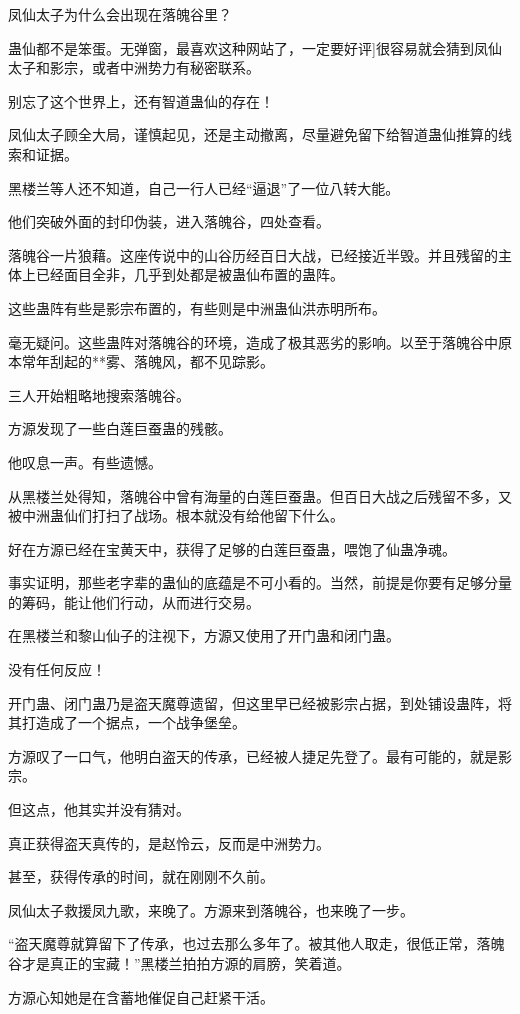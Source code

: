 \begin{this_body}
凤仙太子为什么会出现在落魄谷里？

蛊仙都不是笨蛋。无弹窗，最喜欢这种网站了，一定要好评]很容易就会猜到凤仙太子和影宗，或者中洲势力有秘密联系。

别忘了这个世界上，还有智道蛊仙的存在！

凤仙太子顾全大局，谨慎起见，还是主动撤离，尽量避免留下给智道蛊仙推算的线索和证据。

黑楼兰等人还不知道，自己一行人已经“逼退”了一位八转大能。

他们突破外面的封印伪装，进入落魄谷，四处查看。

落魄谷一片狼藉。这座传说中的山谷历经百日大战，已经接近半毁。并且残留的主体上已经面目全非，几乎到处都是被蛊仙布置的蛊阵。

这些蛊阵有些是影宗布置的，有些则是中洲蛊仙洪赤明所布。

毫无疑问。这些蛊阵对落魄谷的环境，造成了极其恶劣的影响。以至于落魄谷中原本常年刮起的**雾、落魄风，都不见踪影。

三人开始粗略地搜索落魄谷。

方源发现了一些白莲巨蚕蛊的残骸。

他叹息一声。有些遗憾。

从黑楼兰处得知，落魄谷中曾有海量的白莲巨蚕蛊。但百日大战之后残留不多，又被中洲蛊仙们打扫了战场。根本就没有给他留下什么。

好在方源已经在宝黄天中，获得了足够的白莲巨蚕蛊，喂饱了仙蛊净魂。

事实证明，那些老字辈的蛊仙的底蕴是不可小看的。当然，前提是你要有足够分量的筹码，能让他们行动，从而进行交易。

在黑楼兰和黎山仙子的注视下，方源又使用了开门蛊和闭门蛊。

没有任何反应！

开门蛊、闭门蛊乃是盗天魔尊遗留，但这里早已经被影宗占据，到处铺设蛊阵，将其打造成了一个据点，一个战争堡垒。

方源叹了一口气，他明白盗天的传承，已经被人捷足先登了。最有可能的，就是影宗。

但这点，他其实并没有猜对。

真正获得盗天真传的，是赵怜云，反而是中洲势力。

甚至，获得传承的时间，就在刚刚不久前。

凤仙太子救援凤九歌，来晚了。方源来到落魄谷，也来晚了一步。

“盗天魔尊就算留下了传承，也过去那么多年了。被其他人取走，很低正常，落魄谷才是真正的宝藏！”黑楼兰拍拍方源的肩膀，笑着道。

方源心知她是在含蓄地催促自己赶紧干活。


\end{this_body}
